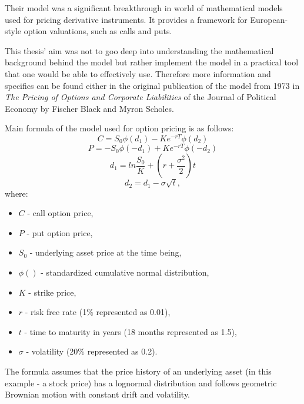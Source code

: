     Their model was a significant breakthrough in world of mathematical models used for pricing derivative instruments. It provides a framework for European-style option valuations, such as calls and puts.
    
    This thesis' aim was not to goo deep into understanding the mathematical background behind the model but rather implement the model in a practical tool that one would be able to effectively use. Therefore more information and specifics can be found either in the original publication \cite{10.2307/1831029} of the model from 1973 in \textit{The Pricing of Options and Corporate Liabilities} of the Journal of Political Economy by Fischer Black and Myron Scholes.
    
    Main formula of the model used for option pricing is as follows:
    \[
    C = S_0\phi(d_1) - Ke^{-rT}\phi(d_2)
    \]
    \[
    P = -S_0\phi(-d_1) + Ke^{-rT}\phi(-d_2)
    \]
    \[
    d_1 = ln\frac{S_0}{K} + (r+\frac{\sigma^2}{2})t
    \]
    \[
    d_2 = d_1 - \sigma\sqrt{t},
    \]
    where:
    \begin{itemize}
        \item $C$ - call option price,
        \item $P$ - put option price,
        \item $S_0$ - underlying asset price at the time being,
        \item $\phi()$ - standardized cumulative normal distribution,
        \item $K$ - strike price,
        \item $r$ - risk free rate (1\% represented as 0.01),
        \item $t$ - time to maturity in years (18 months represented as 1.5),
        \item $\sigma$ - volatility (20\% represented as 0.2).
    \end{itemize}
    
    The formula assumes that the price history of an underlying asset (in this example - a stock price) has a lognormal distribution and follows geometric Brownian motion with constant drift and volatility. 
